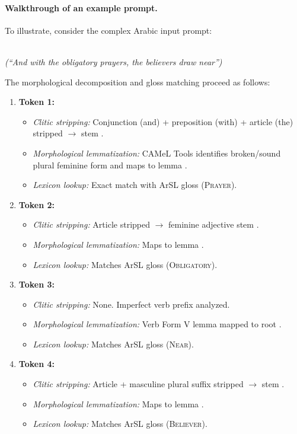 \paragraph{Walkthrough of an example prompt.} To illustrate, consider the complex Arabic input prompt:
\begin{center}
\\
\textit{(``And with the obligatory prayers, the believers draw near'')}
\end{center}
The morphological decomposition and gloss matching proceed as follows:
\begin{enumerate}[leftmargin=*,itemsep=1pt]
  \item \textbf{Token 1: }
    \begin{itemize}[leftmargin=*,itemsep=0pt]
      \item \textit{Clitic stripping:} Conjunction  (and) + preposition  (with) + article  (the) stripped $\rightarrow$ stem .
      \item \textit{Morphological lemmatization:} CAMeL Tools identifies broken/sound plural feminine form and maps to lemma .
      \item \textit{Lexicon lookup:} Exact match with ArSL gloss  (\textsc{Prayer}).
    \end{itemize}
  \item \textbf{Token 2: }
    \begin{itemize}[leftmargin=*,itemsep=0pt]
      \item \textit{Clitic stripping:} Article  stripped $\rightarrow$ feminine adjective stem .
      \item \textit{Morphological lemmatization:} Maps to lemma .
      \item \textit{Lexicon lookup:} Matches ArSL gloss  (\textsc{Obligatory}).
    \end{itemize}
  \item \textbf{Token 3: }
    \begin{itemize}[leftmargin=*,itemsep=0pt]
      \item \textit{Clitic stripping:} None. Imperfect verb prefix  analyzed.
      \item \textit{Morphological lemmatization:} Verb Form V lemma mapped to root .
      \item \textit{Lexicon lookup:} Matches ArSL gloss  (\textsc{Near}).
    \end{itemize}
  \item \textbf{Token 4: }
    \begin{itemize}[leftmargin=*,itemsep=0pt]
      \item \textit{Clitic stripping:} Article  + masculine plural suffix  stripped $\rightarrow$ stem .
      \item \textit{Morphological lemmatization:} Maps to lemma .
      \item \textit{Lexicon lookup:} Matches ArSL gloss  (\textsc{Believer}).
    \end{itemize}
\end{enumerate}
